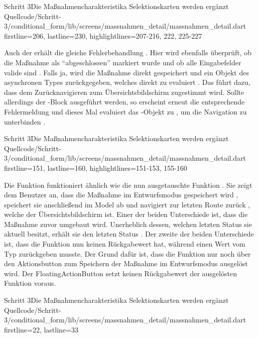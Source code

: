 \begin{alexlisting}{Schritt 3}{Die Maßnahmencharakteristika Selektionskarten werden ergänzt}
    {Quellcode/Schritt-3/conditional_form/lib/screens/massnahmen_detail/massnahmen_detail.dart}
    {firstline=206, lastline=230, highlightlines={207-216, 222, 225-227}}
    \label{lst:Schritt3FloatingActionButton}
\end{alexlisting} 

Auch der  erhält die gleiche Fehlerbehandlung \Lst{\ref{lst:Schritt3onWillPop}}. Hier wird ebenfalls überprüft, ob die Maßnahme als \enquote{abgeschlossen} markiert wurde und ob alle Eingabefelder valide sind . Falls ja, wird die Maßnahme direkt gespeichert und ein Objekt des asynchronen Types  zurückgegeben, welches direkt zu  evaluiert . Das führt dazu, dass dem Zurücknavigieren zum Übersichtsbildschirm zugestimmt wird. Sollte allerdings der -Block ausgeführt werden, so erscheint erneut die entsprechende Fehlermeldung  und dieses Mal evaluiert das -Objekt zu , um die Navigation zu unterbinden . 

\begin{alexlisting}{Schritt 3}{Die Maßnahmencharakteristika Selektionskarten werden ergänzt}
    {Quellcode/Schritt-3/conditional_form/lib/screens/massnahmen_detail/massnahmen_detail.dart}
    {firstline=151, lastline=160, highlightlines={151-153, 155-160}}
    \label{lst:Schritt3onWillPop}
\end{alexlisting}

Die Funktion  funktioniert ähnlich wie die nun ausgetauschte Funktion .
Sie zeigt dem Benutzer an, dass die Maßnahme im Entwurfsmodus gespeichert wird , speichert sie anschließend im Model ab  und navigiert zur letzten Route zurück , welche der Übersichtsbildschirm ist.  Einer der beiden Unterschiede ist, dass die Maßnahme zuvor umgebaut wird. Unerheblich dessen, welchen letzten Status sie aktuell besitzt, erhält sie den letzten Status  . Der zweite der beiden Unterschiede ist, dass die Funktion nun keinen Rückgabewert hat, während  einen Wert vom Typ  zurückgeben musste. Der Grund dafür ist, dass die Funktion nur noch über den Aktionsbutton zum Speichern der Maßnahme im Entwurfsmodus ausgelöst wird. Der FloatingActionButton setzt keinen Rückgabewert der ausgelösten Funktion voraus.

\begin{alexlisting}{Schritt 3}{Die Maßnahmencharakteristika Selektionskarten werden ergänzt}
    {Quellcode/Schritt-3/conditional_form/lib/screens/massnahmen_detail/massnahmen_detail.dart}
    {firstline=22, lastline=33}
    \label{lst:Schritt3saveDraftAndGoBackToOverviewScreen}
\end{alexlisting}

